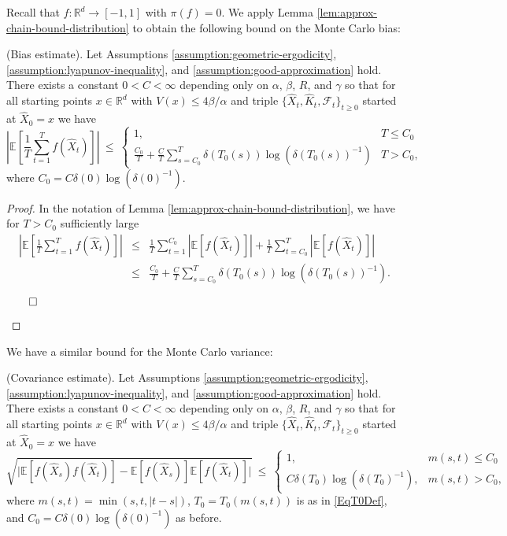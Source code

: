Recall that $f : \mathbb{R}^{d} \to [-1,1]$ with $\pi(f) = 0$. We apply Lemma \ref{lem:approx-chain-bound-distribution} to obtain the following bound on the Monte Carlo bias:
\begin{lemma}
  (Bias estimate). Let Assumptions \ref{assumption:geometric-ergodicity}, \ref{assumption:lyapunov-inequality}, and \ref{assumption:good-approximation} hold. There exists a constant $0 < C < \infty$ depending only on $\alpha$, $\beta$, $R$, and $\gamma$ so that for all starting points $x \in \mathbb{R}^{d}$ with $V(x) \leq 4 \beta / \alpha$ and triple $\{\hat{X}_t, \hat{K}_t, \mathcal{F}_t\}_{t \geq 0}$ started at $\hat{X}_0 = x$ we have 
  \begin{equation*}
    \left| \mathbb{E}\left[ \frac{1}{T} \sum_{t=1}^{T} f(\hat{X}_t) \right] \right|  \ \leq \ \begin{cases}
    1, & T \leq C_0 \\
    \frac{C_0}{T} + \frac{C}{T} \displaystyle\sum_{s=C_0}^{T} \delta(T_{0}(s)) \log{(\delta(T_{0}(s))^{-1})} & T > C_0,
    \end{cases}
  \end{equation*}
where $C_0 = C \delta(0) \log{(\delta(0)^{-1})}$.
\label{lem:bias-estimate}
\end{lemma}
\begin{proof}
 In the notation of Lemma \ref{lem:approx-chain-bound-distribution}, we have for $T > C_0$ sufficiently large
\begin{eqnarray*} 
 \left|\mathbb{E}\left[ \frac{1}{T} \sum_{t=1}^{T} f(\hat{X}_t) \right] \right| & \leq &  \frac{1}{T} \sum_{t=1}^{C_0} |\mathbb{E}[f(\hat{X}_{t})]| + \frac{1}{T} \sum_{t=C_0}^{T} |\mathbb{E}[f(\hat{X}_{t})]| \\
&\leq& \frac{C_0}{T} + \frac{C}{T} \sum_{s=C_0}^{T} \delta(T_{0}(s)) \log(\delta(T_{0}(s))^{-1}). 
\end{eqnarray*}
\begin{flushright}$\qed$\end{flushright}
\end{proof}
We have a similar bound for the Monte Carlo variance: 
\begin{lemma}
  (Covariance estimate). Let Assumptions \ref{assumption:geometric-ergodicity}, \ref{assumption:lyapunov-inequality}, and \ref{assumption:good-approximation} hold. There exists a constant $0 < C < \infty$ depending only on $\alpha$, $\beta$, $R$, and $\gamma$ so that for all starting points $x \in \mathbb{R}^{d}$ with $V(x) \leq 4 \beta / \alpha$ and triple $\{\hat{X}_t, \hat{K}_t, \mathcal{F}_t\}_{t \geq 0}$ started at $\hat{X}_0 = x$ we have 
  \begin{equation*}
      \sqrt{\vert\mathbb{E}[f(\hat{X}_s) f(\hat{X}_t)] - \mathbb{E}[f(\hat{X}_s)] \mathbb{E}[f(\hat{X}_t)] \vert} \  \leq \ \begin{cases}
1, & m(s,t) \leq C_0 \\
  C \delta( T_{0} ) \log{(\delta(T_{0})^{-1})}, & m(s,t) > C_0,
\end{cases}
  \end{equation*}
where $m(s,t) = \min(s,t,|t-s|)$, $T_{0} = T_{0}(m(s,t))$ is as in \eqref{EqT0Def}, and $C_0 = C \delta(0) \log{(\delta(0)^{-1})}$ as before.
\label{lem:covariance-estimate}
\end{lemma}
